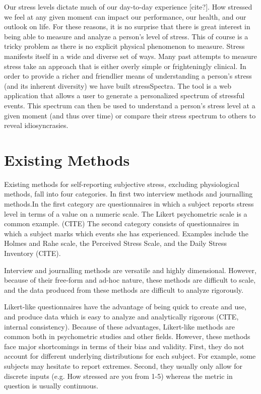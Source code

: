 \documentclass{sigchi}
\begin{document}
Our stress levels dictate much of our day-to-day experience [cite?]. How stressed we feel at any given moment can impact our performance, our health, and our outlook on life. For these reasons, it is no surprise that there is great interest in being able to measure and analyze a person’s level of stress. This of course is a tricky problem as there is no explicit physical phenomenon to measure. Stress manifests itself in a wide and diverse set of ways. Many past attempts to measure stress take an approach that is either overly simple or frighteningly clinical. In order to provide a richer and friendlier means of understanding a person’s stress (and its inherent diversity) we have built stressSpectra. The tool is a web application that allows a user to generate a personalized spectrum of stressful events. This spectrum can then be used to understand a person’s stress level at a given moment (and thus over time) or compare their stress spectrum to others to reveal idiosyncrasies. 


\section{Existing Methods}
Existing methods for self-reporting subjective stress, excluding physiological methods, fall into four categories. In first two interview methods and journalling methods.In the first category are questionnaires in which a subject reports stress level in terms of a value on a numeric scale. The Likert psychometric scale is a common example. (CITE) The second category consists of questionnaires in which a subject marks which events she has experienced. Examples include the Holmes and Rahe scale, the Perceived Stress Scale, and the Daily Stress Inventory (CITE). 

Interview and journalling methods are versatile and highly dimensional. However, because of their free-form and ad-hoc nature, these methods are difficult to scale, and the data produced from these methods are difficult to analyze rigorously.

Likert-like questionnaires have the advantage of being quick to create and use, and produce data which is easy to analyze and analytically rigorous (CITE, internal consistency). Because of these advantages, Likert-like methods are common both in psychometric studies and other fields. However, these methods face major shortcomings in terms of their bias and validity. First, they do not account for different underlying distributions for each subject. For example, some subjects may hesitate to report extremes. Second, they usually only allow for discrete inputs (e.g. How stressed are you from 1-5) whereas the metric in question is usually continuous.
\end{document}
